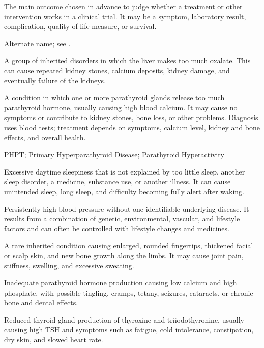  The main outcome chosen in advance to judge whether a treatment or other intervention works in a clinical trial. It may be a symptom, laboratory result, complication, quality-of-life measure, or survival.

 Alternate name; see .

 A group of inherited disorders in which the liver makes too much oxalate. This can cause repeated kidney stones, calcium deposits, kidney damage, and eventually failure of the kidneys.

 A condition in which one or more parathyroid glands release too much parathyroid hormone, usually causing high blood calcium. It may cause no symptoms or contribute to kidney stones, bone loss, or other problems. Diagnosis uses blood tests; treatment depends on symptoms, calcium level, kidney and bone effects, and overall health.

\synonyms
PHPT; Primary Hyperparathyroid Disease; Parathyroid Hyperactivity

 Excessive daytime sleepiness that is not explained by too little sleep, another sleep disorder, a medicine, substance use, or another illness. It can cause unintended sleep, long sleep, and difficulty becoming fully alert after waking.

 Persistently high blood pressure without one identifiable underlying disease. It results from a combination of genetic, environmental, vascular, and lifestyle factors and can often be controlled with lifestyle changes and medicines.

 A rare inherited condition causing enlarged, rounded fingertips, thickened facial or scalp skin, and new bone growth along the limbs. It may cause joint pain, stiffness, swelling, and excessive sweating.

 Inadequate parathyroid hormone production causing low calcium and high phosphate, with possible tingling, cramps, tetany, seizures, cataracts, or chronic bone and dental effects.

 Reduced thyroid-gland production of thyroxine and triiodothyronine, usually causing high TSH and symptoms such as fatigue, cold intolerance, constipation, dry skin, and slowed heart rate.

